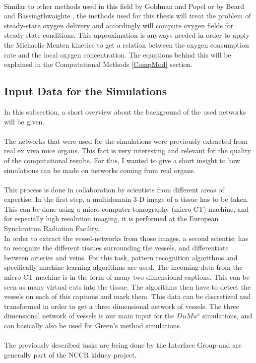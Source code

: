 \\Similar to other methods used in this field by Goldman and Popel \cite{goldman2001computational} or by Beard and Bassingthwaighte \cite{beard2001modeling}, the methods used for this thesis will treat the problem of steady-state oxygen delivery and accordingly will compute oxygen fields for steady-state conditions. This approximation is anyways needed in order to apply the Michaelis-Menten kinetics to get a relation between the oxygen consumption rate and the local oxygen concentration. The equations behind this will be explained in the Computational Methods \ref{CompMod} section.

\subsection{Input Data for the Simulations}

In this subsection, a short overview about the background of the used networks will be given.\\
\\The networks that were used for the simulations were previously extracted from real ex vivo mice organs. This fact is very interesting and relevant for the quality of the computational results. For this, I wanted to give a short insight to how simulations can be made on networks coming from real organs.\\
\\This process is done in collaboration by scientists from different areas of expertise. In the first step, a multidomain 3-D image of a tissue has to be taken. This can be done using a micro-computer-tomography (micro-CT) machine, and for especially high resolution imaging, it is performed at the European Synchrotron Radiation Facility.
\\In order to extract the vessel-networks from those images, a second scientist has to recognize the different tissues surrounding the vessels, and differentiate between arteries and veins. For this task, pattern recognition algorithms and specifically machine learning algorithms are used. The incoming data from the micro-CT machine is in the form of many two dimensional captions. This can be seen as many virtual cuts into the tissue. The algorithms then have to detect the vessels on each of this captions and mark them. This data can be discretized and transformed in order to get a three dimensional network of vessels. The three dimensional network of vessels is our main input for the $DuMu^x$ simulations, and can basically also be used for Green's method simulations.\\
\\The previously described tasks are being done by the Interface Group and are generally part of the NCCR kidney project.


